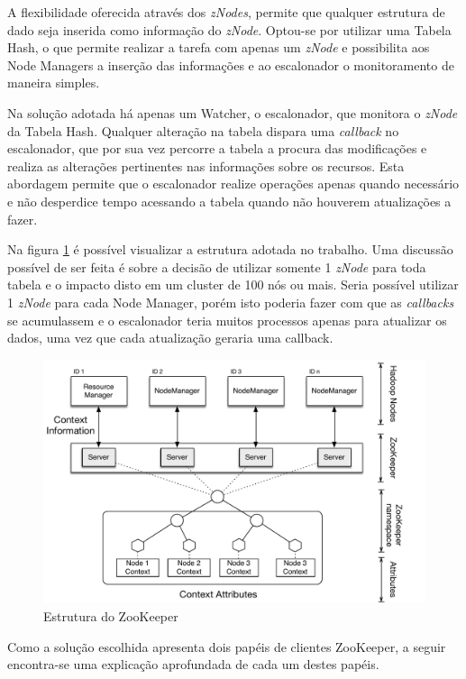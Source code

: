 A flexibilidade oferecida através dos \textit{zNodes}, permite que qualquer estrutura de dado seja inserida como informação do \textit{zNode}. Optou-se por utilizar uma Tabela Hash, o que permite realizar a tarefa com apenas um \textit{zNode} e possibilita aos Node Managers a inserção das informações e ao escalonador o monitoramento de maneira simples.

Na solução adotada há apenas um Watcher, o escalonador, que monitora o \textit{zNode} da Tabela Hash. Qualquer alteração na tabela dispara uma \textit{callback} no escalonador, que por sua vez percorre a tabela a procura das modificações e realiza as alterações pertinentes nas informações sobre os recursos. Esta abordagem permite que o escalonador realize operações apenas quando necessário e não desperdice tempo acessando a tabela quando não houverem atualizações a fazer.

Na figura \ref{fig:zk} é possível visualizar a estrutura adotada no trabalho. Uma discussão possível de ser feita é sobre a decisão de utilizar somente 1 \textit{zNode} para toda tabela e o impacto disto em um cluster de 100 nós ou mais. Seria possível utilizar 1 \textit{zNode} para cada Node Manager, porém isto poderia fazer com que as \textit{callbacks} se acumulassem e o escalonador teria muitos processos apenas para atualizar os dados, uma vez que cada atualização geraria uma callback.

\begin{figure}[!hbtn]
   \centering
   \includegraphics[width=15cm]{figuras/Zookeeper.pdf}
   \caption{Estrutura do ZooKeeper}
   \label{fig:zk}
\end{figure}

Como a solução escolhida apresenta dois papéis de clientes ZooKeeper, a seguir encontra-se uma explicação aprofundada de cada um destes papéis.

